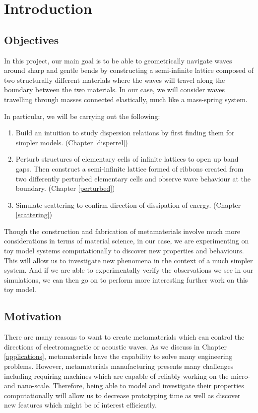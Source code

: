 \chapter{Introduction}

\section{Objectives}
In this project, our main goal is to be able to geometrically navigate waves
around sharp and gentle bends by constructing a semi-infinite lattice composed
of two structurally different materials where the waves will travel along the
boundary between the two materials. In our case, we will consider waves
travelling through masses connected elastically, much like a mass-spring
system.

In particular, we will be carrying out the following:

\begin{enumerate}
\item Build an intuition to study dispersion relations by first finding them
      for simpler models. (Chapter \ref{disperrel})
\item Perturb structures of elementary cells of infinite lattices to open up
      band gaps. Then construct a semi-infinite lattice formed of ribbons
      created from two differently perturbed elementary cells and observe wave
      behaviour at the boundary. (Chapter \ref{perturbed})
\item Simulate scattering to confirm direction of dissipation of energy.
      (Chapter \ref{scattering})
\end{enumerate}

Though the construction and fabrication of metamaterials involve much more
considerations in terms of material science, in our case, we are experimenting
on toy model systems computationally to discover new properties and behaviours.
This will allow us to investigate new phenomena in the context of a much
simpler system. And if we are able to experimentally verify the observations we
see in our simulations, we can then go on to perform more interesting further
work on this toy model.

\section{Motivation}
There are many reasons to want to create metamaterials which can control the
directions of electromagnetic or acoustic waves. As we discuss in Chapter
\ref{applications}, metamaterials have the capability to solve many engineering
problems. However, metamaterials manufacturing presents many challenges
including requiring machines which are capable of reliably working on the
micro- and nano-scale.\cite{metamanu} Therefore, being able to model and
investigate their properties computationally will allow us to decrease
prototyping time as well as discover new features which might be of interest
efficiently.

